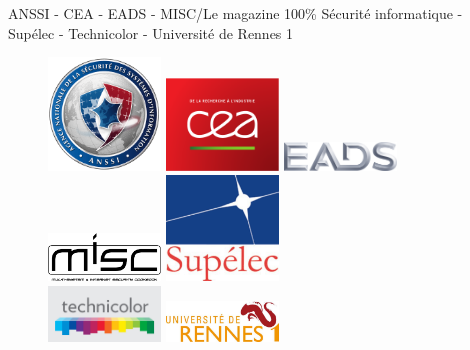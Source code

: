 \begin{center}
ANSSI -  CEA - EADS - MISC/Le magazine 100\% S\'ecurit\'e informatique - Sup\'elec - Technicolor - Universit\'e de Rennes 1
\end{center}

\begin{figure}[h]
\begin{center}
\parbox{3cm}{\includegraphics[width=3cm]{_images/anssi}}
\hfill
\parbox{3cm}{\includegraphics[width=3cm]{_images/cea}}
\hfill
\parbox{3cm}{\includegraphics[width=3cm]{_images/eads}}
\end{center}
\vfill
\begin{center}
\hfill
\parbox{3cm}{\includegraphics[width=3cm]{_images/misc}}
\hfill
\parbox{3cm}{\includegraphics[width=3cm]{_images/supelec}}
\hfill
\mbox{}
\end{center}
\vfill
\begin{center}
\hfill
\parbox{3cm}{\includegraphics[width=3cm]{_images/technicolor}}
\hfill
\parbox{3cm}{\includegraphics[width=3cm]{_images/uni-rennes1}}
\hfill
\mbox{}
\end{center}
\end{figure}


